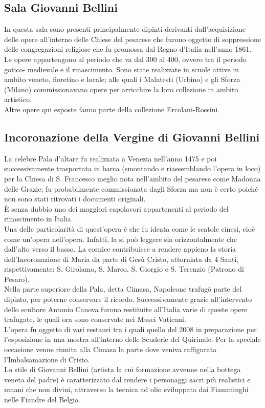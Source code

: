 \documentclass[hidelinks,12pt,a4paper]{article}
\begin{document}
\begin{flushleft}
			\section{Sala Giovanni Bellini}
			In questa sala sono presenti principalmente dipinti derivanti dall'acquisizione delle opere all'interno delle Chiese del pesarese che furono oggetto di soppressione delle congregazioni religiose che fu promossa dal Regno d'Italia nell'anno 1861.\\
			Le opere appartengono al periodo che va dal  300 al 400, ovvero tra il periodo gotico- medievale e il rinascimento. Sono state realizzate in scuole attive in ambito veneto, fioretino e locale; alle quali i Malatesti (Urbino) e gli Sforza (Milano) commissionavano opere per arricchire la loro collezione in ambito artistico.\\
			Altre opere qui esposte fanno parte della collezione Ercolani-Rossini.
	
			\subsection{Incoronazione della Vergine di Giovanni Bellini}
			La celebre Pala d'altare fu realizzata a Venezia nell'anno 1475 e poi successivamente trasportata in barca (smontando e riassemblando l'opera in loco) per la Chiesa di S. Francesco meglio nota nell'ambito del pesarese come Madonna delle Grazie; fu probabilmente commissionata dagli Sforza ma non è certo poiché non sono stati ritrovati i documenti originali.\\
			È senza dubbio uno dei maggiori capolavori appartenenti al periodo del rinascimento in Italia.\\
			Una delle particolarità di quest'opera è che fu ideata come le scatole cinesi, cioè come un’opera nell'opera. Infatti, la si può leggere sia orizzontalmente che dall'alto verso il basso. La cornice contribuisce a rendere appieno la storia dell'Incoronazione di Maria da parte di Gesù Cristo, attorniata da 4 Santi, rispettivamente: S. Girolamo, S. Marco, S. Giorgio e S. Terenzio (Patrono di Pesaro). \\
			Nella parte superiore della Pala, detta Cimasa, Napoleone trafugò parte del dipinto, per poterne conservare il ricordo. Successivamente grazie all'intervento dello scultore Antonio Canova furono restituite all'Italia varie di queste opere trafugate, le quali ora sono conservate nei Musei Vaticani.\\
			L'opera fu oggetto di vari restauri tra i quali quello del 2008 in preparazione per l'esposizione in una mostra all'interno delle Scuderie del Quirinale. Per la speciale occasione venne riunita alla Cimasa la parte dove veniva raffigurata l’Imbalsamazione di Cristo.\\
			Lo stile di Giovanni Bellini (artista la cui formazione avvenne nella bottega veneta del padre)  è caratterizzato dal rendere i personaggi sacri più realistici e umani che non divini, attraverso la tecnica ad olio sviluppata dai Fiamminghi nelle Fiandre del Belgio.
	

\end{flushleft}
\end{document}
